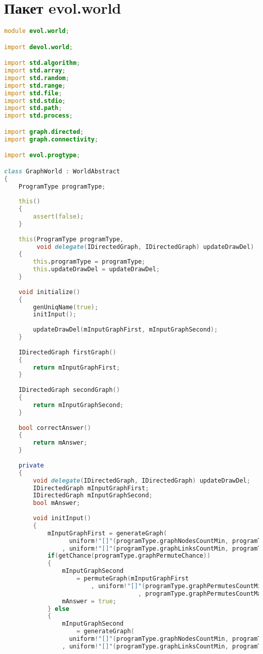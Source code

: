 \documentclass[russian,utf8,emptystyle]{eskdtext}
\begin{document}
\section{Пакет evol.world}
\begin{lstlisting}[language=D]
module evol.world;

import devol.world;

import std.algorithm;
import std.array;
import std.random;
import std.range;
import std.file;
import std.stdio;
import std.path;
import std.process;

import graph.directed;
import graph.connectivity;

import evol.progtype;

class GraphWorld : WorldAbstract
{
    ProgramType programType;
    
    this()
    {
        assert(false);
    }
    
    this(ProgramType programType, 
         void delegate(IDirectedGraph, IDirectedGraph) updateDrawDel)
    {
        this.programType = programType;
        this.updateDrawDel = updateDrawDel;
    }
    
    void initialize()
    {   
        genUniqName(true);
        initInput();
        
        updateDrawDel(mInputGraphFirst, mInputGraphSecond);
    }
    
    IDirectedGraph firstGraph()
    {
        return mInputGraphFirst;
    }
    
    IDirectedGraph secondGraph()
    {
        return mInputGraphSecond;
    }
    
    bool correctAnswer()
    {
        return mAnswer;
    }
    
    private
    {
        void delegate(IDirectedGraph, IDirectedGraph) updateDrawDel;
        IDirectedGraph mInputGraphFirst;
        IDirectedGraph mInputGraphSecond;
        bool mAnswer;
        
        void initInput()
        {
            mInputGraphFirst = generateGraph(
                  uniform!"[]"(programType.graphNodesCountMin, programType.graphNodesCountMax)
                , uniform!"[]"(programType.graphLinksCountMin, programType.graphLinksCountMax));
            if(getChance(programType.graphPermuteChance))
            {
                mInputGraphSecond 
                    = permuteGraph(mInputGraphFirst
                        , uniform!"[]"(programType.graphPermutesCountMin
                                     , programType.graphPermutesCountMax));
                mAnswer = true;
            } else
            {
                mInputGraphSecond 
                    = generateGraph(
                  uniform!"[]"(programType.graphNodesCountMin, programType.graphNodesCountMax)
                , uniform!"[]"(programType.graphLinksCountMin, programType.graphLinksCountMax));
                

\end{lstlisting}
\end{document}
